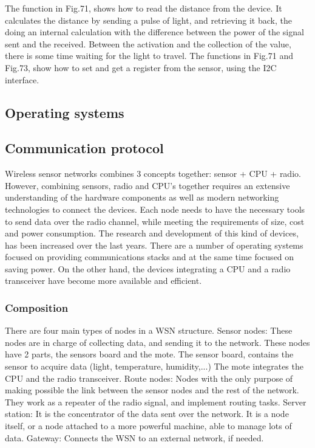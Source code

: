The function in Fig.71,
	shows how to read the distance from the device.
It calculates the distance by sending a pulse of light,
	and retrieving it back,
	the doing an internal calculation with the difference between the power of the signal sent and the received.
Between the activation and the collection of the value,
	there is some time waiting for the light to travel.
The functions in Fig.71 and Fig.73,
	show how to set and get a register from the sensor,
	using the I2C interface.




\subsection{Operating systems}




\subsection{Communication protocol}

Wireless sensor networks combines 3 concepts together:
	sensor + CPU + radio.
However,
	combining sensors,
	radio and CPU's together requires an extensive understanding of the hardware components as well as modern networking technologies to connect the devices.
Each node needs to have the necessary tools to send data over the radio channel,
	while meeting the requirements of size,
	cost and power consumption.
The research and development of this kind of devices,
	has been increased over the last years.
There are a number of operating systems focused on providing communications stacks and at the same time focused on saving power.
On the other hand,
	the devices integrating a CPU and a radio transceiver have become more available and efficient.

\subsubsection{Composition}
There are four main types of nodes in a WSN structure.
Sensor nodes:
	These nodes are in charge of collecting data,
	and sending it to the network.
These nodes have 2 parts,
	the sensors board and the mote.
The sensor board,
	contains the sensor to acquire data (light,
	temperature,
	humidity,...) The mote integrates the CPU and the radio transceiver.
Route nodes:
	Nodes with the only purpose of making possible the link between the sensor nodes and the rest of the network.
They work as a repeater of the radio signal,
	and implement routing tasks.
Server station:
	It is the concentrator of the data sent over the network.
It is a node itself,
	or a node attached to a more powerful machine,
	able to manage lots of data.
Gateway:
	Connects the WSN to an external network,
	if needed.

